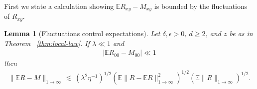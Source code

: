 \documentclass[11pt]{amsart}
\def\Expec{{\mathbb E}}
\def\lsim{{\,\lesssim\,}}
\numberwithin{equation}{section}
\numberwithin{theorem}{section}
\newtheorem{lemma}[theorem]{Lemma}
\begin{document}
First we state a calculation showing $\mathbb{E} R_{xy} - M_{xy}$ is bounded by the fluctuations of $R_{xy}$.
\begin{lemma}[Fluctuations control expectations]
\label{lem:fluct-to-er}
Let $\delta,\epsilon>0$, $d\geq 2$, and $z$ be as in Theorem ~\ref{thm:local-law}.
If $ \lambda\ll 1$ and
\begin{align}\label{eq:ERMInitial}
   |\Expec R_{00}-M_{00}|\ll 1
\end{align}
then
\begin{align*}
\|\Expec R - M\|_{1\to \infty}
\lsim(\lambda^2\eta^{-1})^{1 /2} \left(  \Expec \|R-\Expec R\|_{1\to \infty}^{2}\right) ^{1/ 2}
\left( \Expec\|R\|_{1\to \infty} \right)^{1 /2}.
\end{align*}


\end{lemma}
\end{document}
